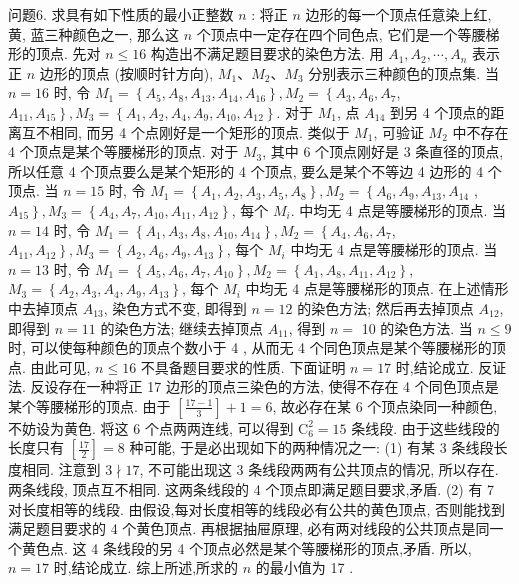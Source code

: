 问题6. 求具有如下性质的最小正整数 $n$ : 将正 $n$ 边形的每一个顶点任意染上红, 黄, 蓝三种颜色之一, 那么这 $n$ 个顶点中一定存在四个同色点, 它们是一个等腰梯形的顶点.
先对 $n \leqslant 16$ 构造出不满足题目要求的染色方法.
用 $A_1, A_2, \cdots, A_n$ 表示正 $n$ 边形的顶点 (按顺时针方向), $M_1 、 M_2 、 M_3$ 分别表示三种颜色的顶点集.
当 $n=16$ 时, 令 $M_1=\left\{A_5, A_8, A_{13}, A_{14}, A_{16}\right\}, M_2=\left\{A_3, A_6, A_7\right.$, $\left.A_{11}, A_{15}\right\}, M_3=\left\{A_1, A_2, A_4, A_9, A_{10}, A_{12}\right\}$. 对于 $M_1$, 点 $A_{14}$ 到另 4 个顶点的距离互不相同, 而另 4 个点刚好是一个矩形的顶点.
类似于 $M_1$, 可验证 $M_2$ 中不存在 4 个顶点是某个等腰梯形的顶点.
对于 $M_3$, 其中 6 个顶点刚好是 3 条直径的顶点, 所以任意 4 个顶点要么是某个矩形的 4 个顶点, 要么是某个不等边 4 边形的 4 个顶点.
当 $n=15$ 时, 令 $M_1=\left\{A_1, A_2, A_3, A_5, A_8\right\}, M_2=\left\{A_6, A_9, A_{13}, A_{14}\right.$ , $\left.A_{15}\right\}, M_3=\left\{A_4, A_7, A_{10}, A_{11}, A_{12}\right\}$, 每个 $M_i$. 中均无 4 点是等腰梯形的顶点.
当 $n=14$ 时, 令 $M_1=\left\{A_1, A_3, A_8, A_{10}, A_{14}\right\}, M_2=\left\{A_4, A_6, A_7\right.$, $\left.A_{11}, A_{12}\right\}, M_3=\left\{A_2, A_6, A_9, A_{13}\right\}$, 每个 $M_i$ 中均无 4 点是等腰梯形的顶点.
当 $n=13$ 时, 令 $M_1=\left\{A_5, A_6, A_7, A_{10}\right\}, M_2=\left\{A_1, A_8, A_{11}, A_{12}\right\}$, $M_3=\left\{A_2, A_3, A_4, A_9, A_{13}\right\}$, 每个 $M_i$ 中均无 4 点是等腰梯形的顶点.
在上述情形中去掉顶点 $A_{13}$, 染色方式不变, 即得到 $n=12$ 的染色方法; 然后再去掉顶点 $A_{12}$, 即得到 $n=11$ 的染色方法; 继续去掉顶点 $A_{11}$, 得到 $n=$ 10 的染色方法.
当 $n \leqslant 9$ 时, 可以使每种颜色的顶点个数小于 4 , 从而无 4 个同色顶点是某个等腰梯形的顶点.
由此可见, $n \leqslant 16$ 不具备题目要求的性质.
下面证明 $n=17$ 时,结论成立.
反证法.
反设存在一种将正 17 边形的顶点三染色的方法, 使得不存在 4 个同色顶点是某个等腰梯形的顶点.
由于 $\left[\frac{17-1}{3}\right]+1=6$, 故必存在某 6 个顶点染同一种颜色, 不妨设为黄色.
将这 6 个点两两连线, 可以得到 $\mathrm{C}_6^2=15$ 条线段.
由于这些线段的长度只有 $\left[\frac{17}{2}\right]=8$ 种可能, 于是必出现如下的两种情况之一:
(1) 有某 3 条线段长度相同.
注意到 $3 \nmid 17$, 不可能出现这 3 条线段两两有公共顶点的情况, 所以存在.
两条线段, 顶点互不相同.
这两条线段的 4 个顶点即满足题目要求,矛盾.
(2) 有 7 对长度相等的线段.
由假设,每对长度相等的线段必有公共的黄色顶点, 否则能找到满足题目要求的 4 个黄色顶点.
再根据抽屉原理, 必有两对线段的公共顶点是同一个黄色点.
这 4 条线段的另 4 个顶点必然是某个等腰梯形的顶点,矛盾.
所以, $n=17$ 时,结论成立.
综上所述,所求的 $n$ 的最小值为 17 .


